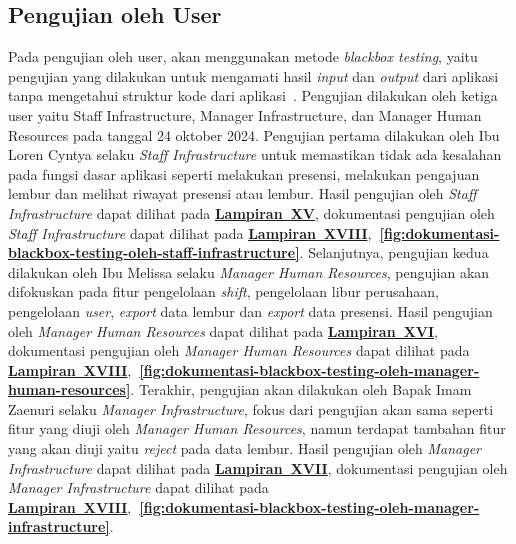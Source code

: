 \subsection{Pengujian oleh User}
Pada pengujian oleh user, akan menggunakan metode \textit{blackbox testing}, yaitu pengujian yang dilakukan untuk mengamati hasil \textit{input} dan \textit{output} dari aplikasi tanpa mengetahui struktur kode dari aplikasi~\cite{introducion2023panagiotis}. Pengujian dilakukan oleh ketiga user yaitu Staff Infrastructure, Manager Infrastructure, dan Manager Human Resources pada tanggal 24 oktober 2024. Pengujian pertama dilakukan oleh Ibu Loren Cyntya selaku \textit{Staff Infrastructure} untuk memastikan tidak ada kesalahan pada fungsi dasar aplikasi seperti melakukan presensi, melakukan pengajuan lembur dan melihat riwayat presensi atau lembur. Hasil pengujian oleh \textit{Staff Infrastructure} dapat dilihat pada \textbf{\hyperref[sec:blackbox-testing-aplikasi-presensi-online-oleh-staff-infrastructure]{Lampiran~XV}}, dokumentasi pengujian oleh \textit{Staff Infrastructure} dapat dilihat pada \textbf{\hyperref[sec:dokumentasi-blackbox-testing]{Lampiran~XVIII}},\textbf{~\ref{fig:dokumentasi-blackbox-testing-oleh-staff-infrastructure}}. Selanjutnya, pengujian kedua dilakukan oleh Ibu Melissa selaku \textit{Manager Human Resources}, pengujian akan difokuskan pada fitur pengelolaan \textit{shift}, pengelolaan libur perusahaan, pengelolaan \textit{user}, \textit{export} data lembur dan \textit{export} data presensi. Hasil pengujian oleh \textit{Manager Human Resources} dapat dilihat pada \textbf{\hyperref[sec:blackbox-testing-aplikasi-presensi-online-oleh-manager-hrd]{Lampiran~XVI}}, dokumentasi pengujian oleh \textit{Manager Human Resources} dapat dilihat pada \textbf{\hyperref[sec:dokumentasi-blackbox-testing]{Lampiran~XVIII}},\textbf{~\ref{fig:dokumentasi-blackbox-testing-oleh-manager-human-resources}}. Terakhir, pengujian akan dilakukan oleh Bapak Imam Zaenuri selaku \textit{Manager Infrastructure}, fokus dari pengujian akan sama seperti fitur yang diuji oleh \textit{Manager Human Resources}, namun terdapat tambahan fitur yang akan diuji yaitu \textit{reject} pada data lembur. Hasil pengujian oleh \textit{Manager Infrastructure} dapat dilihat pada \textbf{\hyperref[sec:blackbox-testing-aplikasi-presensi-online-oleh-manager-infrastructure]{Lampiran~XVII}}, dokumentasi pengujian oleh \textit{Manager Infrastructure} dapat dilihat pada \textbf{\hyperref[sec:dokumentasi-blackbox-testing]{Lampiran~XVIII}},\textbf{~\ref{fig:dokumentasi-blackbox-testing-oleh-manager-infrastructure}}.

